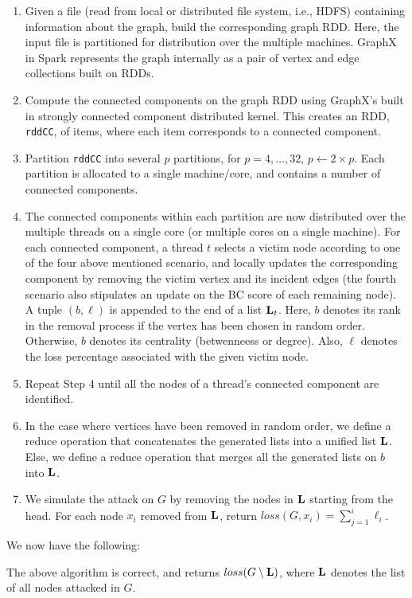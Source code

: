 \begin{enumerate}
\item Given a file (read from local or distributed file system, i.e., HDFS) containing information about the graph, build the corresponding graph RDD. Here, the input file is partitioned for distribution over the multiple machines. GraphX in Spark represents the graph internally as a pair of vertex and edge collections built on RDDs. 
\item Compute the connected components on the graph RDD using GraphX's built in strongly connected component distributed kernel. This creates an RDD, \texttt{rddCC}, of items, where each item corresponds to a connected component. 
\item Partition \texttt{rddCC} into several $p$ partitions, for $p = 4, \ldots, 32$, $p \leftarrow 2\times p$. Each partition is allocated to a single machine/core, and contains a number of connected components.  
\item The connected components within each partition are now distributed over the multiple threads on a single core (or multiple cores on a single machine). For each connected component, a thread $t$ selects a victim node according to one of the four above mentioned scenario, and locally updates the corresponding component by removing the victim vertex and its incident edges (the fourth scenario also stipulates an update on the BC score of each remaining node). A tuple $(b,\ell)$ is appended to the end of a list ${\bf L}_t$. Here, $b$ denotes its rank in the removal process if the vertex has been chosen in random order. Otherwise, $b$ denotes its centrality (betwenneess or degree). Also, $\ell$ denotes the loss percentage associated with the given victim node. 
\item Repeat Step 4 until all the nodes of a thread's connected component are identified. 
\item In the case where vertices have been removed in random order, we define a reduce operation that concatenates the generated lists into a unified list ${\bf L}$. Else, we define a reduce operation that merges all the generated lists on $b$ into ${\bf L}$.
\item We simulate the attack on $G$ by removing the nodes in ${\bf L}$ starting from the head. For each node $x_i$ removed from ${\bf L}$, return $loss(G,x_i) = \sum_{j = 1}^{i} \ell_i$. 
\end{enumerate}
We now have the following:
\begin{proposition}
The above algorithm is correct, and returns $loss(G\setminus {\bf L})$, where ${\bf L}$ denotes the list of all nodes attacked in $G$.
\end{proposition}
